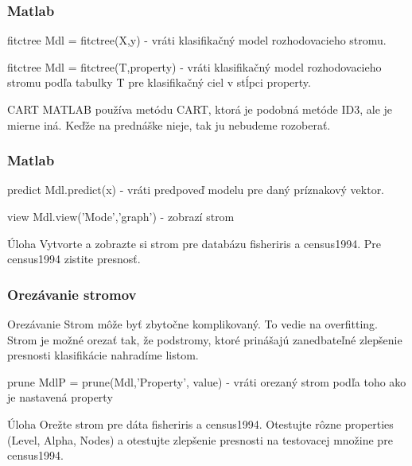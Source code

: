 \documentclass{beamer}
\begin{document}
\begin{frame}
\frametitle{Matlab}
\begin{block}{fitctree}
Mdl = fitctree(X,y) - vráti klasifikačný model rozhodovacieho stromu.
\end{block}

\begin{block}{fitctree}
Mdl = fitctree(T,property) - vráti klasifikačný model rozhodovacieho stromu podľa tabulky T pre klasifikačný ciel v stĺpci property.
\end{block}

\begin{block}{CART}
MATLAB používa metódu CART, ktorá je podobná metóde ID3, ale je mierne iná. Keďže na prednáške nieje, tak ju nebudeme rozoberať.
\end{block}
\end{frame}


\begin{frame}
\frametitle{Matlab}

\begin{block}{predict}
Mdl.predict(x) - vráti predpoveď modelu pre daný príznakový vektor.
\end{block}

\begin{block}{view}
Mdl.view('Mode','graph') - zobrazí strom
\end{block}

\begin{block}{Úloha}
Vytvorte a zobrazte si strom pre databázu fisheriris a census1994. Pre census1994 zistite presnosť.
\end{block}
\end{frame}

\begin{frame}
\frametitle{Orezávanie stromov}
\begin{block}{Orezávanie}
Strom môže byť zbytočne komplikovaný. To vedie na overfitting. Strom je možné orezať tak, že podstromy, ktoré prinášajú zanedbateľné zlepšenie presnosti klasifikácie nahradíme listom.
\end{block}

\begin{block}{prune}
MdlP = prune(Mdl,'Property', value) - vráti orezaný strom podľa toho ako je nastavená property
\end{block}

\begin{block}{Úloha}
Orežte strom pre dáta fisheriris a census1994. Otestujte rôzne properties (Level, Alpha, Nodes) a otestujte zlepšenie presnosti na testovacej množine pre census1994.
\end{block}

\end{frame}
\end{document}
